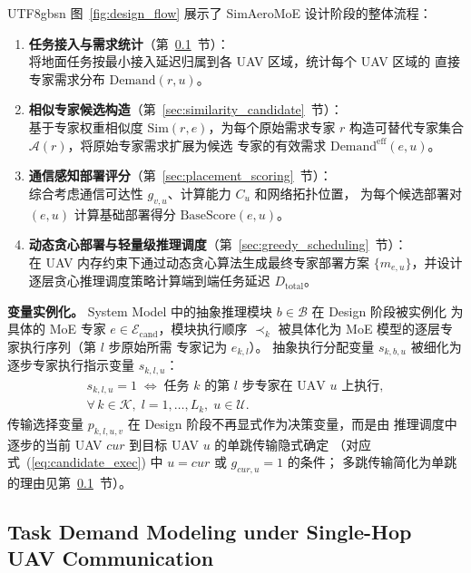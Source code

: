 \documentclass[conference]{IEEEtran}
\begin{document}
\begin{CJK*}{UTF8}{gbsn}
图~\ref{fig:design_flow} 展示了 SimAeroMoE 设计阶段的整体流程：
\begin{enumerate}
  \item \textbf{任务接入与需求统计}（第~\ref{sec:demand_modeling}~节）：\\
        将地面任务按最小接入延迟归属到各 UAV 区域，统计每个 UAV 区域的
        直接专家需求分布 $\mathrm{Demand}(r,u)$。
  \item \textbf{相似专家候选构造}（第~\ref{sec:similarity_candidate}~节）：\\
        基于专家权重相似度 $\mathrm{Sim}(r,e)$，为每个原始需求专家 $r$
        构造可替代专家集合 $\mathcal{A}(r)$，将原始专家需求扩展为候选
        专家的有效需求 $\mathrm{Demand}^{\mathrm{eff}}(e,u)$。
  \item \textbf{通信感知部署评分}（第~\ref{sec:placement_scoring}~节）：\\
        综合考虑通信可达性 $g_{v,u}$、计算能力 $C_u$ 和网络拓扑位置，
        为每个候选部署对 $(e,u)$ 计算基础部署得分 $\mathrm{BaseScore}(e,u)$。
  \item \textbf{动态贪心部署与轻量级推理调度}（第~\ref{sec:greedy_scheduling}~节）：\\
        在 UAV 内存约束下通过动态贪心算法生成最终专家部署方案
        $\{m_{e,u}\}$，并设计逐层贪心推理调度策略计算端到端任务延迟
        $D_{\mathrm{total}}$。
\end{enumerate}



\textbf{变量实例化。}
System Model 中的抽象推理模块 $b\in\mathcal{B}$ 在 Design 阶段被实例化
为具体的 MoE 专家 $e\in\mathcal{E}_{\mathrm{cand}}$，模块执行顺序
$\prec_k$ 被具体化为 MoE 模型的逐层专家执行序列（第 $l$ 步原始所需
专家记为 $e_{k,l}$）。
抽象执行分配变量 $s_{k,b,u}$ 被细化为逐步专家执行指示变量 $s_{k,l,u}$：
\begin{multline}
s_{k,l,u}=1 \;\Longleftrightarrow\; \text{任务 }k\text{ 的第 }l\text{ 步专家在 UAV }u
\text{ 上执行},\\[2pt]
\forall\,k\in\mathcal{K},\; l=1,\ldots,L_k,\; u\in\mathcal{U}.
\label{eq:sklu_def}
\end{multline}
传输选择变量 $p_{k,l,u,v}$ 在 Design 阶段不再显式作为决策变量，而是由
推理调度中逐步的当前 UAV $cur$ 到目标 UAV $u$ 的单跳传输隐式确定
（对应式~(\ref{eq:candidate_exec}) 中 $u=cur$ 或 $g_{cur,u}=1$ 的条件；
多跳传输简化为单跳的理由见第~\ref{sec:demand_modeling}~节）。

\subsection{Task Demand Modeling under Single-Hop UAV Communication}
\label{sec:demand_modeling}


\end{CJK*}
\end{document}
